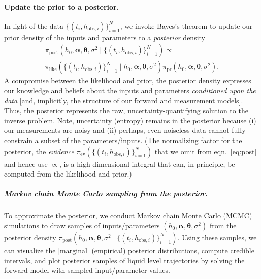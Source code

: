\documentclass[a4paper,fleqn]{cas-dc}
\newcommand\thedata {$\{(t_i,h_{\text{obs}, i})\}_{i=1}^{N}$\xspace}
\newcommand\thedatanomath {\{(t_i,h_{\text{obs}, i})\}_{i=1}^{N}}
\begin{document}
\paragraph{Update the prior to a posterior.}
In light of the data \thedata, we invoke Bayes's theorem  \cite{van2021bayesian,calvetti2018inverse} to update our prior density of the inputs and parameters to a \emph{posterior} density
\begin{multline}
\pi_{\text{post}}(h_0, \boldsymbol \alpha, \boldsymbol \theta, \sigma^2 \mid \thedatanomath) \propto \\ %
	\pi_{\text{like}}(\thedatanomath \mid h_0,  \boldsymbol \alpha, \boldsymbol \theta, \sigma^2 ) 
	\pi_{\text{pr}}(h_0, \boldsymbol\alpha, \boldsymbol \theta, \sigma^2).
	 \label{eq:post}
\end{multline} 
A compromise between the likelihood and prior,
the posterior density expresses our knowledge and beliefs about the inputs and parameters \emph{conditioned upon the data} [and, implicitly, the structure of our forward and measurement models]. 
Thus, the posterior represents the raw, uncertainty-quantifying solution to the inverse problem.
Note, uncertainty (entropy) remains in the posterior because
 (i) our measurements are noisy and 
 (ii) perhaps, even noiseless data cannot fully constrain a subset of the parameters/inputs.
(The normalizing factor for the posterior, the \emph{evidence} $\pi_{\text{ev}}(\thedatanomath)$ that we omit from eqn.~\ref{eq:post} and hence use $\propto$, is a high-dimensional integral that can, in principle, be computed from the likelihood and prior.)


\subparagraph{Markov chain Monte Carlo sampling from the posterior.}
To approximate the posterior, we conduct Markov chain Monte Carlo (MCMC) simulations \cite{robert1999monte,van2021bayesian} to draw samples of inputs/parameters $(h_0, \boldsymbol \alpha, \boldsymbol \theta, \sigma^2 )$ from the posterior density $\pi_{\text{post}}(h_0, \boldsymbol \alpha, \boldsymbol \theta, \sigma^2 \mid \thedatanomath)$. 
Using these samples, we can visualize the [marginal] (empirical) posterior distributions, compute credible intervals, and plot posterior samples of liquid level trajectories by solving the forward model with sampled input/parameter values.
\end{document}
